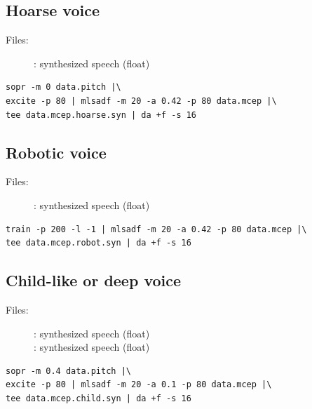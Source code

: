 \documentclass[a4paper]{article}
\begin{document}
\subsection{Hoarse voice}

\begin{description}
\item[Files:]
  : 
  synthesized speech (float)\\
\end{description}

\begin{verbatim}
sopr -m 0 data.pitch |\
excite -p 80 | mlsadf -m 20 -a 0.42 -p 80 data.mcep |\
tee data.mcep.hoarse.syn | da +f -s 16 
\end{verbatim}

\subsection{Robotic voice}

\begin{description}
\item[Files:]
  : 
  synthesized speech (float)
\end{description}

\begin{verbatim}
train -p 200 -l -1 | mlsadf -m 20 -a 0.42 -p 80 data.mcep |\
tee data.mcep.robot.syn | da +f -s 16
\end{verbatim}

\subsection{Child-like or deep voice}

\begin{description}
\item[Files:]
  : 
  synthesized speech (float)\\
  : 
  synthesized speech (float)
\end{description}

\begin{verbatim}
sopr -m 0.4 data.pitch |\
excite -p 80 | mlsadf -m 20 -a 0.1 -p 80 data.mcep |\
tee data.mcep.child.syn | da +f -s 16
\end{verbatim}
\end{document}
